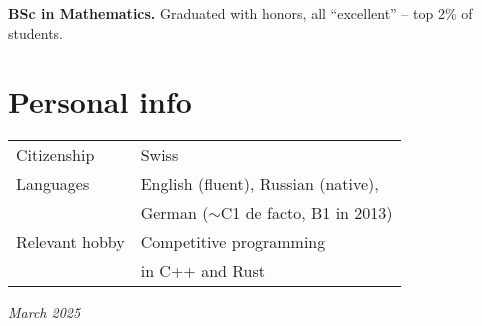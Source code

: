\documentclass[a4paper, twocolumn, 10pt]{article}
\begin{document}
\textbf{BSc in Mathematics.} Graduated with honors, all ``excellent'' -- top 2\% of students.

\section*{Personal info}

\begin{tabular}{l l}
  \vspace{0.2cm}
  Citizenship & Swiss \\
  Languages & English (fluent), Russian (native), \\
  \vspace{0.2cm}
  & German ($\sim$C1 de facto, B1 in 2013) \\
  Relevant hobby & Competitive programming \\
  \vspace{0.2cm}
  & in C++ and Rust \\
\end{tabular}

\vspace*{\fill}
\hfill \emph{March 2025}
\end{document}
